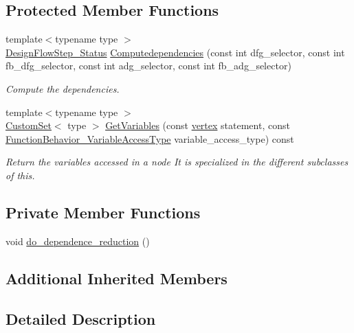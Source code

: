 \subsection*{Protected Member Functions}
\begin{DoxyCompactItemize}
\item 
{\footnotesize template$<$typename type $>$ }\\\hyperlink{design__flow__step_8hpp_afb1f0d73069c26076b8d31dbc8ebecdf}{Design\+Flow\+Step\+\_\+\+Status} \hyperlink{classDataDependenceComputation_ab155da20f80879f2c0e4006827445460}{Computedependencies} (const int dfg\+\_\+selector, const int fb\+\_\+dfg\+\_\+selector, const int adg\+\_\+selector, const int fb\+\_\+adg\+\_\+selector)
\begin{DoxyCompactList}\small\item\em Compute the dependencies. \end{DoxyCompactList}\item 
{\footnotesize template$<$typename type $>$ }\\\hyperlink{custom__set_8hpp_a615bc2f42fc38a4bb1790d12c759e86f}{Custom\+Set}$<$ type $>$ \hyperlink{classDataDependenceComputation_afc0ac97b717aedd766f8deffc14cfee8}{Get\+Variables} (const \hyperlink{graph_8hpp_abefdcf0544e601805af44eca032cca14}{vertex} statement, const \hyperlink{function__behavior_8hpp_a68c28bfcfefbe63cece191e941af0409}{Function\+Behavior\+\_\+\+Variable\+Access\+Type} variable\+\_\+access\+\_\+type) const
\begin{DoxyCompactList}\small\item\em Return the variables accessed in a node It is specialized in the different subclasses of this. \end{DoxyCompactList}\end{DoxyCompactItemize}
\subsection*{Private Member Functions}
\begin{DoxyCompactItemize}
\item 
void \hyperlink{classDataDependenceComputation_aa9f8b4902a09304d4c75850dfc0d0b10}{do\+\_\+dependence\+\_\+reduction} ()
\end{DoxyCompactItemize}
\subsection*{Additional Inherited Members}


\subsection{Detailed Description}


